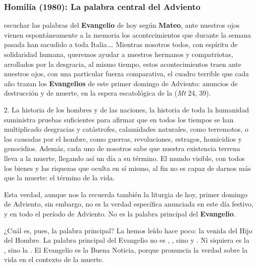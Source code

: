 \subsubsection{Homilía (1980): La palabra central del Adviento}


\begin{body}	
	 escuchar las palabras del \textbf{Evangelio} de hoy según \textbf{Mateo}, ante nuestros ojos vienen espontáneamente a la memoria los acontecimientos que durante la semana pasada han sacudido a toda Italia.\ldots{} Mientras nosotros todos, con espíritu de solidaridad humana, queremos ayudar a nuestros hermanos y compatriotas, arrollados por la desgracia, al mismo tiempo, estos acontecimientos traen ante nuestros ojos, con una particular fuerza comparativa, el cuadro terrible que cada año trazan los \textbf{Evangelios} de este primer domingo de Adviento: anuncios de destrucción y de muerte, en la espera escatológica de la  (\emph{Mt} 24, 39). 
	
	2. La historia de los hombres y de las naciones, la historia de toda la humanidad suministra pruebas suficientes para afirmar que en todos los tiempos se han multiplicado desgracias y catástrofes, calamidades naturales, como terremotos, o las causadas por el hombre, como guerras, revoluciones, estragos, homicidios y genocidios. Además, cada uno de nosotros sabe que nuestra existencia terrena lleva a la muerte, llegando así un día a su término. El mundo visible, con todos los bienes y las riquezas que oculta en sí mismo, al fin no es capaz de darnos más que la muerte: el término de la vida. 
	
	Esta verdad, aunque nos la recuerda también la liturgia de hoy, primer domingo de Adviento, sin embargo, no es la verdad específica anunciada en este día festivo, y en todo el período de Adviento. No es la palabra principal del \textbf{Evangelio}. 
	
	¿Cuál es, pues, la palabra principal? La hemos leído hace poco: la venida del Hijo del Hombre. La palabra principal del Evangelio no es , , sino  y . Ni siquiera es la , sino la . El Evangelio es la Buena Noticia, porque pronuncia la verdad sobre la vida en el contexto de la muerte. 
	

\end{body}
